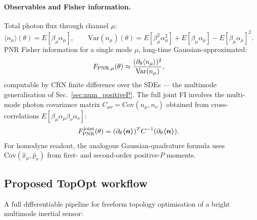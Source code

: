 \documentclass[11pt]{article}
\begin{document}
\paragraph{Observables and Fisher information.}  Total photon flux
through channel $\mu$:
\begin{equation}
  \langle n_\mu\rangle(\theta) = E[\beta_\mu\alpha_\mu],\qquad
  \mathrm{Var}(n_\mu)(\theta) = E[\beta_\mu^2\alpha_\mu^2] + E[\beta_\mu\alpha_\mu]
  - E[\beta_\mu\alpha_\mu]^2.
\end{equation}
PNR Fisher information for a single mode $\mu$, long-time Gaussian-approximated:
\begin{equation}
  F_{\rm PNR,\mu}(\theta) \approx \frac{(\partial_\theta\langle n_\mu\rangle)^2}
                                         {\mathrm{Var}(n_\mu)},
  \label{eq:F_PNR_salt}
\end{equation}
computable by CRN finite difference over the SDEs --- the multimode
generalisation of Sec.~\ref{sec:num_positiveP}.  The full joint FI
involves the multi-mode photon covariance matrix $C_{\mu\nu} = \mathrm{Cov}(n_\mu, n_\nu)$
obtained from cross-correlations $E[\beta_\mu\alpha_\mu\beta_\nu\alpha_\nu]$:
\begin{equation}
  F_{\rm PNR}^{\rm joint}(\theta)
  = (\partial_\theta \boldsymbol{\langle n\rangle})^T
     C^{-1}(\partial_\theta \boldsymbol{\langle n\rangle}).
  \label{eq:F_PNR_salt_joint}
\end{equation}
For homodyne readout, the analogous Gaussian-quadrature formula uses
$\mathrm{Cov}(\hat x_\mu, \hat p_\nu)$ from first- and
second-order positive-$P$ moments.

\subsection{Proposed TopOpt workflow}
\label{sec:salt_topopt}

A full differentiable pipeline for freeform topology optimisation of a
bright multimode inertial sensor:
\end{document}
